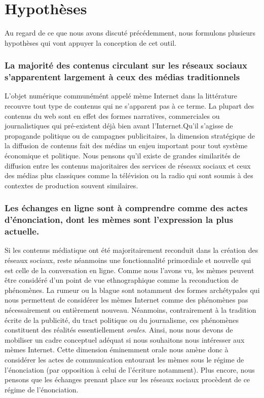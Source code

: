 \section*{Hypothèses}
\label{sec:hypotheses}

Au regard de ce que nous avons discuté précédemment, nous formulons plusieurs hypothèses qui  vont appuyer la conception de cet outil.

\subsubsection{La majorité des contenus circulant sur les réseaux sociaux s'apparentent largement à ceux des médias traditionnels} 

L'objet numérique communémént appelé mème Internet dans la littérature recouvre tout type de contenus qui ne s'apparent pas à ce terme. La plupart des contenus du web sont en effet des formes narratives, commerciales ou journalistiques qui pré-existent déjà bien avant l'Internet.Qu{\textquoteright}il s{\textquoteright}agisse de propagande politique ou de campagnes publicitaires, la dimension stratégique de la diffusion de contenus fait des médias un enjeu important pour tout système économique et politique. Nous pensons qu{\textquoteright}il existe de grandes similarités de diffusion entre les contenus majoritaires des services de réseaux sociaux et ceux des médias plus classiques comme la télévision ou la radio qui sont soumis à des contextes de production souvent similaires.

\subsubsection{Les échanges en ligne sont à comprendre comme des actes d'énonciation, dont les mèmes sont l'expression la plus actuelle.}

Si les contenus médiatique ont été majoritairement reconduit dans la création des réseaux sociaux, reste néanmoins une fonctionnalité primordiale et nouvelle qui est celle de la conversation en ligne. Comme nous l'avons vu, les mèmes peuvent être considéré d'un point de vue ethnographique comme la reconduction de phénomènes. La rumeur ou la blague sont notamment des formes archétypales qui nous permettent de considérer les mèmes Internet comme des phénomènes pas nécessairement ou entièrement nouveau. Néanmoins, contrairement à la tradition écrite de la publicité, du tract politique ou du journalisme, ces phénomènes constituent des réalités essentiellement \textit{orales}. Ainsi, nous nous devons de mobiliser un cadre conceptuel adéquat si nous souhaitons nous intéresser aux mèmes Internet. Cette dimension éminemment orale nous amène donc à considérer les actes de communication entourant les mèmes sous le régime de l'énonciation (par opposition à celui de l'écriture notamment). Plus encore, nous pensons que les échanges prenant place sur les réseaux sociaux procèdent de ce régime de l'énonciation.


